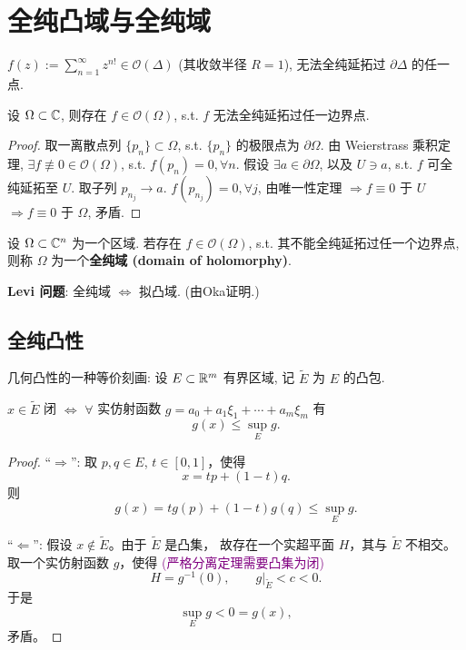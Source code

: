 \chapter{全纯凸域与全纯域}

\begin{example}[Riemann]
    $f(z):=\sum_{n=1}^{\infty }z^{n!} \in \mathcal{O}(\Delta )$ (其收敛半径 $R=1$), 无法全纯延拓过 $\partial \Delta $ 的任一点.    
\end{example}

\begin{example}[Weierstrass]
    设 $\Omega \subset  {\mathbb C}$, 则存在 $f \in \mathcal{O}(\Omega )$, s.t. $f$ 无法全纯延拓过任一边界点.   
\end{example}
\begin{proof}
    取一离散点列 $\{p_n\} \subset \Omega $, s.t. $\{p_n\}$ 的极限点为 $\partial \Omega $.
    由 Weierstrass 乘积定理, $\exists f \not \equiv 0 \in \mathcal{O}(\Omega )$, s.t. $f(p_n)=0, \forall n$.
    假设 $\exists a \in \partial \Omega $,  以及 $U \ni a$, s.t. $f$ 可全纯延拓至 $U$. 取子列 $p_{n_j} \to a.$ $f(p_{n_j})=0, \forall j$, 由唯一性定理 $\Rightarrow f \equiv 0 $ 于 $U$ $\Rightarrow f \equiv 0$ 于 $\Omega $, 矛盾.              
\end{proof}

\begin{definition}
    设 $\Omega \subset {\mathbb C}^n$ 为一个区域. 若存在 $f \in \mathcal{O}(\Omega )$, s.t. 其不能全纯延拓过任一个边界点, 则称 $\Omega $ 为一个\textbf{全纯域 (domain of holomorphy)}.   
\end{definition}

\noindent \textbf{Levi 问题}: 全纯域 $\iff $ 拟凸域. (由Oka证明.) 

\section{全纯凸性}
几何凸性的一种等价刻画: 
设 $E \subset {\mathbb R}^m$ 有界区域, 记 $\widetilde{E}$ 为 $E$ 的凸包.   

\begin{lemma}\label{lem4.1}
     $x \in \widetilde{E}$ 闭 $\iff $ $\forall $ 实仿射函数 
     $ g=a_0+a_1 \xi _1+\cdots +a_m \xi _m $ 
     有 
     $$ g(x) \leq \sup_{E} g .$$ 
\end{lemma}
\begin{proof}
``\(\Rightarrow\)'': 取 \(p,q\in E\), \(t\in[0,1]\)，使得
\[
x=tp+(1-t)q.
\]
则
\[
g(x)
=
tg(p)+(1-t)g(q)
\leq
\sup_E g.
\]

``\(\Leftarrow\)'': 假设 \(x\notin\widetilde{E}\)。由于 \(\widetilde{E}\) 是凸集，
故存在一个实超平面 \(H\)，其与 \(\widetilde{E}\) 不相交。
取一个实仿射函数 \(g\)，使得 \textcolor{purple}{(严格分离定理需要凸集为闭)}
\[
H=g^{-1}(0),
\qquad
g|_{\widetilde{E}}<c<0.
\]
于是
\[
\sup_E g<0=g(x),
\]
矛盾。
\end{proof}


